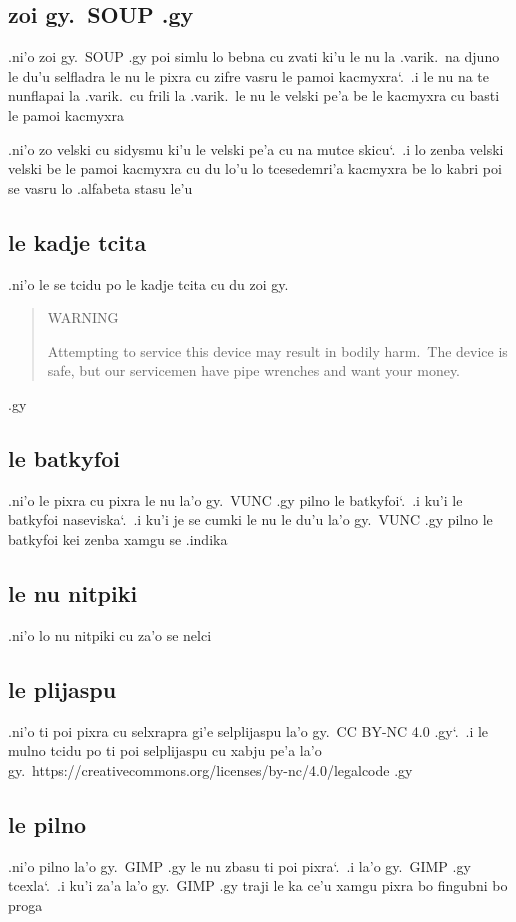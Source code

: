 \documentclass{report}
\newcommand\sds{\spacefactor\sfcode`.\ \space}
\begin{document}
\subsection{zoi gy.\ SOUP .gy}
.ni'o zoi gy.\ SOUP .gy poi simlu lo bebna cu zvati ki'u le nu la .varik.\ na djuno le du'u selfladra le nu le pixra cu zifre vasru le pamoi kacmyxra\sds  .i le nu na te nunflapai la .varik.\ cu frili la .varik.\ le nu le velski pe'a be le kacmyxra cu basti le pamoi kacmyxra

.ni'o zo velski cu sidysmu ki'u le velski pe'a cu na mutce skicu\sds  .i lo zenba velski velski be le pamoi kacmyxra cu du lo'u lo tcesedemri'a kacmyxra be lo kabri poi se vasru lo .alfabeta stasu le'u

\subsection{le kadje tcita}
.ni'o le se tcidu po le kadje tcita cu du zoi gy.
\begin{quote}
	WARNING

	Attempting to service this device may result in bodily harm.\  The device is safe, but our servicemen have pipe wrenches and want your money.
\end{quote}
.gy

\subsection{le batkyfoi}
.ni'o le pixra cu pixra le nu la'o gy.\ VUNC .gy pilno le batkyfoi\sds  .i ku'i le batkyfoi naseviska\sds  .i ku'i je se cumki le nu le du'u la'o gy.\ VUNC .gy pilno le batkyfoi kei zenba xamgu se .indika

\subsection{le nu nitpiki}
.ni'o lo nu nitpiki cu za'o se nelci

\subsection{le plijaspu}
.ni'o ti poi pixra cu selxrapra gi'e selplijaspu la'o gy.\ CC BY-NC 4.0 .gy\sds .i le mulno tcidu po ti poi selplijaspu cu xabju pe'a la'o gy.\ https://creativecommons.org/licenses/by-nc/4.0/legalcode .gy

\subsection{le pilno}
.ni'o pilno la'o gy.\ GIMP .gy le nu zbasu ti poi pixra\sds  .i la'o gy.\ GIMP .gy tcexla\sds  .i ku'i za'a la'o gy.\ GIMP .gy traji le ka ce'u xamgu pixra bo fingubni bo proga
\end{document}
